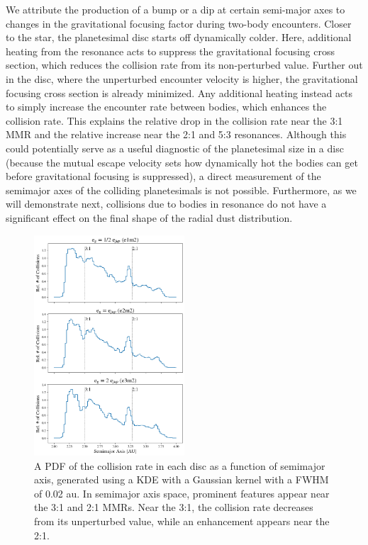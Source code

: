 \documentclass[fleqn,usenatbib]{mnras}
\begin{document}
We attribute the production of a bump or a dip at certain semi-major axes to changes in the gravitational focusing factor during two-body encounters. 
Closer to the star, the planetesimal disc starts off dynamically colder. Here, additional heating from the resonance acts to suppress the gravitational 
focusing cross section, which reduces the collision rate from its
non-perturbed value. Further out in the disc, where the unperturbed
encounter velocity is higher, the gravitational focusing cross section
is already minimized. Any additional heating instead acts to simply
increase the encounter rate between bodies, which enhances the
collision rate. This explains the relative drop in the collision rate
near the 3:1 MMR and the relative increase near the 2:1 and 5:3
resonances. Although this could potentially serve as a useful
diagnostic of the planetesimal size in a disc (because the mutual
escape velocity sets how dynamically hot the bodies can get before
gravitational focusing is suppressed), a direct measurement of the
semimajor axes of the colliding planetesimals is not
possible. Furthermore, as we will demonstrate next, collisions due to bodies in resonance do not have a significant effect on the final shape of the radial dust distribution.

\begin{figure}
\begin{center}
    \includegraphics[width=0.5\textwidth]{figures/coll_hist_a.png}
    \caption{A PDF of the collision rate in each disc as a function of semimajor axis, generated using a KDE with a Gaussian kernel with a FWHM of 0.02 au. In semimajor axis space, prominent features appear near the 3:1 and 2:1 MMRs. Near the 3:1, the collision rate decreases from its unperturbed value, while an enhancement appears near the 2:1.\label{fig:coll_hist_a}}
\end{center}
\end{figure}
\end{document}
